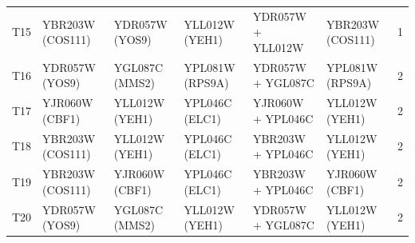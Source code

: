 \begin{table}[H]
\begin{tabular}{lllllll}
T15 & YBR203W (COS111) & YDR057W (YOS9) & YLL012W (YEH1) & YDR057W + YLL012W & YBR203W (COS111) & 1 \\
T16 & YDR057W (YOS9) & YGL087C (MMS2) & YPL081W (RPS9A) & YDR057W + YGL087C & YPL081W (RPS9A) & 2 \\
T17 & YJR060W (CBF1) & YLL012W (YEH1) & YPL046C (ELC1) & YJR060W + YPL046C & YLL012W (YEH1) & 2 \\
T18 & YBR203W (COS111) & YLL012W (YEH1) & YPL046C (ELC1) & YBR203W + YPL046C & YLL012W (YEH1) & 2 \\
T19 & YBR203W (COS111) & YJR060W (CBF1) & YPL046C (ELC1) & YBR203W + YPL046C & YJR060W (CBF1) & 2 \\
T20 & YDR057W (YOS9) & YGL087C (MMS2) & YLL012W (YEH1) & YDR057W + YGL087C & YLL012W (YEH1) & 2 \\
\bottomrule
\end{tabular}
\end{table}
